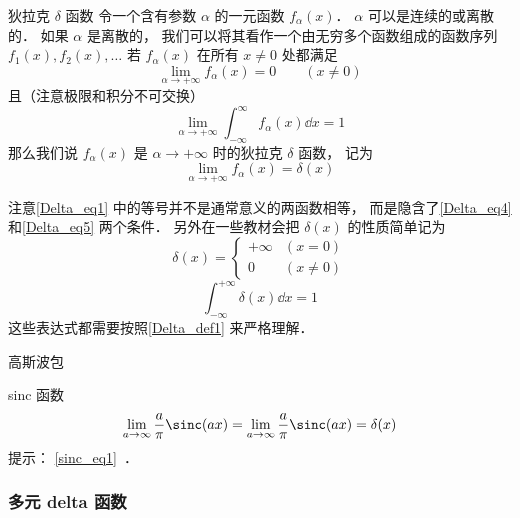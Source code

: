 \begin{definition}{狄拉克 $\delta$ 函数}\label{Delta_def1}
令一个含有参数 $\alpha$ 的一元函数 $f_\alpha(x)$． $\alpha$ 可以是连续的或离散的． 如果 $\alpha$ 是离散的， 我们可以将其看作一个由无穷多个函数组成的函数序列 $f_1(x), f_2(x), \dots$ 若 $f_\alpha(x)$ 在所有 $x \ne 0$ 处都满足
\begin{equation}\label{Delta_eq4}
\lim_{\alpha\to+\infty} f_\alpha(x) = 0 \qquad (x \ne 0)
\end{equation}
且（注意极限和积分不可交换）
\begin{equation}\label{Delta_eq5}
\lim_{\alpha\to+\infty} \int_{-\infty}^{\infty} f_\alpha(x) \dd{x} = 1
\end{equation}
那么我们说 $f_\alpha(x)$ 是 $\alpha\to+\infty$ 时的狄拉克 $\delta$ 函数， 记为
\begin{equation}\label{Delta_eq1}
\lim_{\alpha\to+\infty} f_\alpha(x) = \delta(x)
\end{equation}
\end{definition}
注意\autoref{Delta_eq1} 中的等号并不是通常意义的两函数相等， 而是隐含了\autoref{Delta_eq4} 和\autoref{Delta_eq5} 两个条件． 另外在一些教材会把 $\delta(x)$ 的性质简单记为
\begin{equation}\label{Delta_eq2}
\delta(x) =
\begin{cases}
+\infty & (x = 0)\\
0 & (x \ne 0)
\end{cases}
\end{equation}
\begin{equation}\label{Delta_eq3}
\int_{-\infty}^{+\infty} \delta(x) \dd{x} = 1
\end{equation}
这些表达式都需要按照\autoref{Delta_def1} 来严格理解．

\begin{example}{高斯波包}
\end{example}
\begin{exercise}{sinc 函数}
\begin{equation}
\lim_{a\to\infty}\frac{a}{\pi}\sinc(a x) = \lim_{a\to\infty}\frac{a}{\pi}\sinc(a x) = \delta(x)
\end{equation}
提示： \autoref{sinc_eq1}~．
\end{exercise}

\subsubsection{多元 delta 函数}

